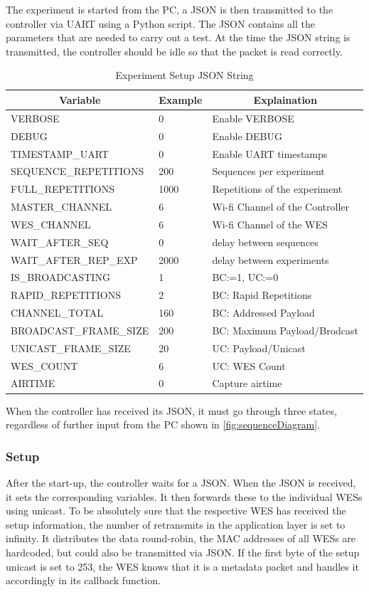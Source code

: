 The experiment is started from the PC, a JSON is then transmitted to the controller via \ac{UART} using a Python script.
The JSON contains all the parameters that are needed to carry out a test.
At the time the JSON string is transmitted, the controller should be idle so that the packet is read correctly.

\begin{table}[h]
	\centering
	\begin{tabular} { lll }
	\toprule
	\multicolumn{1}{c}{Variable}
	& \multicolumn{1}{c}{Example}
	& \multicolumn{1}{c}{Explaination} \\
	\midrule
	VERBOSE               & 0 				& Enable VERBOSE \\
	DEBUG                 & 0 				& Enable DEBUG \\
	TIMESTAMP\_UART       & 0				& Enable UART timestamps \\
	SEQUENCE\_REPETITIONS & 200				& Sequences per experiment \\
	FULL\_REPETITIONS     & 1000			& Repetitions of the experiment \\
	MASTER\_CHANNEL       & 6				& Wi-fi Channel of the Controller \\
	WES\_CHANNEL          & 6				& Wi-fi Channel of the WES \\
	WAIT\_AFTER\_SEQ      & 0				& delay between sequences \\
	WAIT\_AFTER\_REP\_EXP & 2000			& delay between experiments \\
	IS\_BROADCASTING      & 1				& BC:=1, UC:=0 \\
	RAPID\_REPETITIONS     & 2				& BC: Rapid Repetitions \\
	CHANNEL\_TOTAL        & 160	 			& BC: Addressed Payload \\
	BROADCAST\_FRAME\_SIZE& 200 			& BC: Maximum Payload/Brodcast \\
	UNICAST\_FRAME\_SIZE  & 20				& UC: Payload/Unicast \\
	WES\_COUNT            & 6				& UC: WES Count \\
	AIRTIME               & 0				& Capture airtime\\
	\bottomrule
	\end{tabular}
	\caption{Experiment Setup JSON String}
	\label{tab:json}
\end{table}

When the controller has received its JSON, it must go through three states, 
regardless of further input from the PC shown in \cref{fig:sequenceDiagram}.
\subsubsection*{Setup}
After the start-up, the controller waits for a JSON. When the JSON is received, it sets the corresponding variables.
It then forwards these to the individual WESs using unicast. 
To be absolutely sure that the respective WES has received the setup information,
the number of retransmits in the application layer is set to infinity.
It distributes the data round-robin, the MAC addresses of all WESs are hardcoded, but could also be transmitted via JSON.
If the first byte of the setup unicast is set to 253, the WES knows that it is a metadata packet and handles it accordingly in its callback function.
